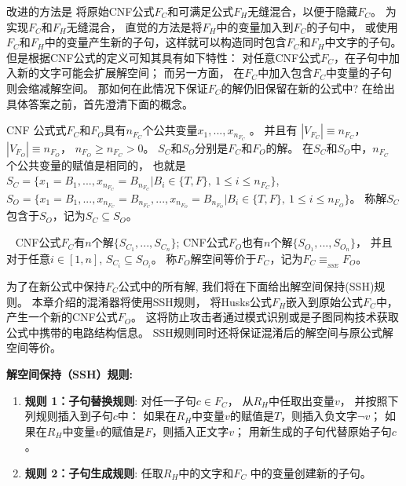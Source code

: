 改进的方法是
将原始CNF公式$F_C$和可满足公式$F_H$无缝混合，以便于隐藏$F_C$。
为实现$F_C$和$F_H$无缝混合，
直觉的方法是将$F_H$中的变量加入到$F_C$的子句中，
或使用$F_C$和$F_H$中的变量产生新的子句，这样就可以构造同时包含$F_C$和$F_H$中文字的子句。
但是根据CNF公式的定义可知其具有如下特性：
对任意CNF公式$F_C$，在子句中加入新的文字可能会扩展解空间；
而另一方面，
在$F_C$中加入包含$F_C$中变量的子句则会缩减解空间。
那如何在此情况下保证$F_C$的解仍旧保留在新的公式中?
在给出具体答案之前，首先澄清下面的概念。

\begin{definition}
CNF 公式式$F_C$和$F_O$具有$n_{F_C}$个公共变量$x_1,...,x_{n_{F_C}}$ 。
并且有
$|V_{F_C}|\equiv n_{F_C}$， $|V_{F_O}|\equiv n_{F_O}$， $ n_{F_O}\geqslant n_{F_C} > 0$。
$S_C$和$S_O$分别是$F_C$和$F_O$的解。
在$S_C$和$S_O$中，$n_{F_C}$ 个公共变量的赋值是相同的， 也就是
$S_C=\{x_1=B_1,...,x_{n_{F_C}}=B_{n_{F_C}} | B_i \in \{T,F\},~1\leqslant i\leqslant n_{F_C} \}$,
$S_O=\{x_1=B_1,...,x_{n_{F_C}}=B_{n_{F_C}},...,x_{n_{F_O}}=B_{n_{F_O}}|B_i\in \{T,F\},~ 1\leqslant i\leqslant n_{F_O} \}$。
称解$S_C$包含于$S_O$，记为$S_C\subseteq S_O$。
\end{definition}

\begin{definition}\label{3:SSEdefinition}~
CNF公式$F_C$有$n$个解$\{S_{C_1},...,S_{C_n}\}$;
CNF公式$F_O$也有$n$个解$\{S_{O_1},...,S_{O_n}\}$，
并且对于任意$i \in [1,n]$, $S_{C_i} \subseteq S_{O_i}$。
称$F_O$解空间等价于$F_C$，记为$F_C \equiv_{_{SSE}} F_O$。
\end{definition}

为了在新公式中保持$F_C$公式中的所有解,
我们将在下面给出解空间保持(SSH)规则。
本章介绍的混淆器将使用SSH规则，
将Husks公式$F_H$嵌入到原始公式$F_C$中，产生一个新的CNF公式$F_O$。
这将防止攻击者通过模式识别或是子图同构技术获取公式中携带的电路结构信息。
SSH规则同时还将保证混淆后的解空间与原公式解空间等价。

\textbf{解空间保持（SSH）规则: }
\begin{enumerate}
\item[] \textbf{规则 1：子句替换规则}:
对任一子句$c\in F_{C}$，
从$R_H$中任取出变量$v$，
并按照下列规则插入到子句$c$中：
如果在$R_H$中变量$v$的赋值是$T$，则插入负文字$\neg v$；
如果在$R_H$中变量$v$的赋值是$F$，则插入正文字$v$；
用新生成的子句代替原始子句$c$。
\item[] \textbf{规则 2：子句生成规则}:
任取$R_H$中的文字和$F_C$ 中的变量创建新的子句。
\end{enumerate}

